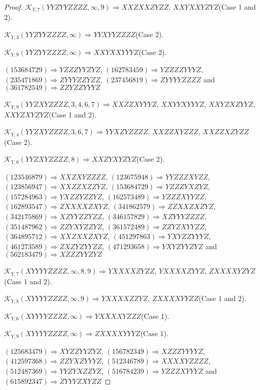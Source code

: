 \documentclass[12pt]{article}
\theoremstyle{plain}
\theoremstyle{definition}
\theoremstyle{remark}
\newcommand{\fancy}[1]{\mathcal{#1}}
\def\K{\fancy{K}}
\begin{document}
\begin{proof}
	$\K_{Y,7}(YYZYYZZZZ,\infty,9)\Rightarrow $$XXZXXZYZZ$, $XXYXXYZYZ$(Case 1 and 2).
	
	$\K_{Y,3}(YYZYYZZZZ,\infty)\Rightarrow $$YYXYYZZZZ$(Case 2).
	
	$\K_{Y,9}(YYZYYZZZZ,\infty)\Rightarrow $$XXYXXYYYZ$(Case 2).
	
	
	
	$(1 5 3 6 8 4 7 2 9)\Rightarrow YZZZYYZYZ$, $(1 6 2 7 8 3 4 5 9)\Rightarrow YZZZZYYYZ$, $(2 3 5 4 7 1 8 6 9)\Rightarrow ZYYYZZYZZ$, $(2 3 7 4 5 6 8 1 9)\Rightarrow ZYYYYZZZZ$ and $(3 6 1 7 8 2 5 4 9)\Rightarrow ZZYZZYYYZ$
	
	
	$\K_{Y,9}(YYZXYZZZZ,3, 4, 6, 7)\Rightarrow $$XXZZXYYYZ$, $XXYYXYYYZ$, $XXYZXZYYZ$, $XXYZXYZYZ$(Case 1 and 2).
	
	$\K_{Y,4}(YYZXYZZZZ,3, 6, 7)\Rightarrow $$YYXZYZZZZ$, $XXZZXYZZZ$, $XXZZXZYZZ$(Case 2).
	
	$\K_{Y,6}(YYZXYZZZZ,8)\Rightarrow $$XXZYXYZYZ$(Case 2).
	
	
	
	$(1 2 3 5 4 6 8 7 9)\Rightarrow XXZXYZZZZ$, $(1 2 3 6 7 5 9 4 8)\Rightarrow YYZZZXYZZ$, $(1 2 3 8 5 6 9 4 7)\Rightarrow XXZZXZZYZ$, $(1 5 3 6 8 4 7 2 9)\Rightarrow YZZZYXZYZ$, $(1 5 7 2 8 4 9 6 3)\Rightarrow YXZZYZZYZ$, $(1 6 2 5 7 3 4 8 9)\Rightarrow YZZZXYYZZ$, $(1 6 2 8 9 3 5 4 7)\Rightarrow ZXXXXZXYZ$, $(3 4 1 8 6 2 5 7 9)\Rightarrow ZZXXZXZYZ$, $(3 4 2 1 7 5 8 6 9)\Rightarrow XZYYZZYZZ$, $(3 4 6 1 5 7 8 2 9)\Rightarrow XZYYYZZZZ$, $(3 5 1 4 8 7 9 6 2)\Rightarrow ZZYXYZZYZ$, $(3 6 1 5 7 2 4 8 9)\Rightarrow ZZYZXYYZZ$, $(3 6 4 8 9 5 7 1 2)\Rightarrow XXZXXZXYZ$, $(4 5 1 2 9 7 8 6 3)\Rightarrow YXYZZYYYZ$, $(4 6 1 2 7 3 5 8 9)\Rightarrow ZXZYZYYZZ$, $(4 7 1 2 9 3 6 5 8)\Rightarrow YXYZYYZYZ$ and $(5 6 2 1 8 3 4 7 9)\Rightarrow XZZZYYZYZ$
	
	
	$\K_{Y,7}(XYYYYZZZZ,\infty,8, 9)\Rightarrow $$YXXXXZYZZ$, $YXXXXZYYZ$, $ZXXXXYZYZ$(Case 1 and 2).
	
	$\K_{Y,8}(XYYYYZZZZ,\infty,9)\Rightarrow $$YXXXXZZYZ$, $ZXXXXYYZZ$(Case 1 and 2).
	
	$\K_{Y,6}(XYYYYZZZZ,\infty)\Rightarrow $$YXXXXYZZZ$(Case 1).
	
	$\K_{Y,9}(XYYYYZZZZ,\infty)\Rightarrow $$ZXXXXYYYZ$(Case 1).
	
	
	
	$(1 2 5 6 8 3 4 7 9)\Rightarrow XYZZYYZYZ$, $(1 5 6 7 8 2 3 4 9)\Rightarrow XZZZYYYYZ$, $(4 1 2 5 9 7 3 6 8)\Rightarrow ZZYXZYYYZ$, $(5 1 2 3 4 6 7 8 9)\Rightarrow XXXXYZZZZ$, $(5 1 2 4 8 7 3 6 9)\Rightarrow YYZYXZZYZ$, $(5 1 6 7 8 4 2 3 9)\Rightarrow YZZZXYYYZ$ and $(6 1 5 8 9 2 3 4 7)\Rightarrow ZYYYZXYZZ$
	

\end{proof}
\end{document}
